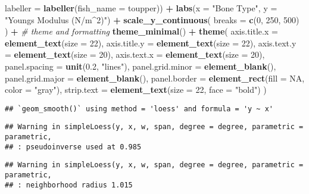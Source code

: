 \documentclass[
]{article}
\newenvironment{Shaded}{\begin{snugshade}}{\end{snugshade}}
\newcommand{\AttributeTok}[1]{\textcolor[rgb]{0.13,0.29,0.53}{#1}}
\newcommand{\CommentTok}[1]{\textcolor[rgb]{0.56,0.35,0.01}{\textit{#1}}}
\newcommand{\ConstantTok}[1]{\textcolor[rgb]{0.56,0.35,0.01}{#1}}
\newcommand{\DecValTok}[1]{\textcolor[rgb]{0.00,0.00,0.81}{#1}}
\newcommand{\FloatTok}[1]{\textcolor[rgb]{0.00,0.00,0.81}{#1}}
\newcommand{\FunctionTok}[1]{\textcolor[rgb]{0.13,0.29,0.53}{\textbf{#1}}}
\newcommand{\NormalTok}[1]{#1}
\newcommand{\SpecialCharTok}[1]{\textcolor[rgb]{0.81,0.36,0.00}{\textbf{#1}}}
\newcommand{\StringTok}[1]{\textcolor[rgb]{0.31,0.60,0.02}{#1}}
\begin{document}
\begin{Shaded}
\begin{Highlighting}[]
              \AttributeTok{labeller =} \FunctionTok{labeller}\NormalTok{(}\AttributeTok{fish\_name =}\NormalTok{ toupper)) }\SpecialCharTok{+}
  \FunctionTok{labs}\NormalTok{(}\AttributeTok{x =} \StringTok{"Bone Type"}\NormalTok{, }\AttributeTok{y =} \StringTok{"Young\textquotesingle{}s Modulus (N/m\^{}2)"}\NormalTok{) }\SpecialCharTok{+}
 \FunctionTok{scale\_y\_continuous}\NormalTok{(}
    \AttributeTok{breaks =} \FunctionTok{c}\NormalTok{(}\DecValTok{0}\NormalTok{, }\DecValTok{250}\NormalTok{, }\DecValTok{500}\NormalTok{)}
\NormalTok{  ) }\SpecialCharTok{+}
  \CommentTok{\# theme and formatting}
  \FunctionTok{theme\_minimal}\NormalTok{() }\SpecialCharTok{+}
  \FunctionTok{theme}\NormalTok{(}
    \AttributeTok{axis.title.x =} \FunctionTok{element\_text}\NormalTok{(}\AttributeTok{size =} \DecValTok{22}\NormalTok{),}
    \AttributeTok{axis.title.y =} \FunctionTok{element\_text}\NormalTok{(}\AttributeTok{size =} \DecValTok{22}\NormalTok{),}
    \AttributeTok{axis.text.y =} \FunctionTok{element\_text}\NormalTok{(}\AttributeTok{size =} \DecValTok{20}\NormalTok{),}
    \AttributeTok{axis.text.x =} \FunctionTok{element\_text}\NormalTok{(}\AttributeTok{size =} \DecValTok{20}\NormalTok{),}
    \AttributeTok{panel.spacing =} \FunctionTok{unit}\NormalTok{(}\FloatTok{0.2}\NormalTok{, }\StringTok{"lines"}\NormalTok{),}
    \AttributeTok{panel.grid.minor =} \FunctionTok{element\_blank}\NormalTok{(),}
    \AttributeTok{panel.grid.major =} \FunctionTok{element\_blank}\NormalTok{(),}
    \AttributeTok{panel.border =} \FunctionTok{element\_rect}\NormalTok{(}\AttributeTok{fill =} \ConstantTok{NA}\NormalTok{, }\AttributeTok{color =} \StringTok{"gray"}\NormalTok{),}
    \AttributeTok{strip.text =} \FunctionTok{element\_text}\NormalTok{(}\AttributeTok{size =} \DecValTok{22}\NormalTok{, }\AttributeTok{face =} \StringTok{"bold"}\NormalTok{)}
\NormalTok{  )}
\end{Highlighting}
\end{Shaded}

\begin{verbatim}
## `geom_smooth()` using method = 'loess' and formula = 'y ~ x'
\end{verbatim}

\begin{verbatim}
## Warning in simpleLoess(y, x, w, span, degree = degree, parametric = parametric,
## : pseudoinverse used at 0.985
\end{verbatim}

\begin{verbatim}
## Warning in simpleLoess(y, x, w, span, degree = degree, parametric = parametric,
## : neighborhood radius 1.015
\end{verbatim}
\end{document}
